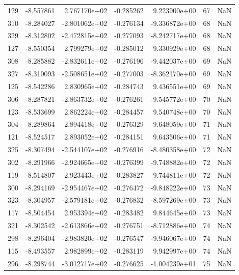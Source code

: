 \begin{tabular}{rrrrrrr}
 129 &  -8.557861 &  2.767170e+02 & -0.285262 &  9.223900e+00 &          67 & NaN \\
 310 &  -8.284027 & -2.801062e+02 & -0.276134 & -9.336872e+00 &          68 & NaN \\
 329 &  -8.312802 & -2.472815e+02 & -0.277093 & -8.242717e+00 &          68 & NaN \\
 127 &  -8.550354 &  2.799279e+02 & -0.285012 &  9.330929e+00 &          68 & NaN \\
 308 &  -8.285882 & -2.832611e+02 & -0.276196 & -9.442037e+00 &          69 & NaN \\
 327 &  -8.310093 & -2.508651e+02 & -0.277003 & -8.362170e+00 &          69 & NaN \\
 125 &  -8.542286 &  2.830965e+02 & -0.284743 &  9.436551e+00 &          69 & NaN \\
 306 &  -8.287821 & -2.863732e+02 & -0.276261 & -9.545772e+00 &          70 & NaN \\
 123 &  -8.533699 &  2.862224e+02 & -0.284457 &  9.540748e+00 &          70 & NaN \\
 304 &  -8.289864 & -2.894418e+02 & -0.276329 & -9.648059e+00 &          71 & NaN \\
 121 &  -8.524517 &  2.893052e+02 & -0.284151 &  9.643506e+00 &          71 & NaN \\
 325 &  -8.307494 & -2.544107e+02 & -0.276916 & -8.480358e+00 &          72 & NaN \\
 302 &  -8.291966 & -2.924665e+02 & -0.276399 & -9.748882e+00 &          72 & NaN \\
 119 &  -8.514807 &  2.923443e+02 & -0.283827 &  9.744811e+00 &          72 & NaN \\
 300 &  -8.294169 & -2.954467e+02 & -0.276472 & -9.848222e+00 &          73 & NaN \\
 323 &  -8.304957 & -2.579181e+02 & -0.276832 & -8.597269e+00 &          73 & NaN \\
 117 &  -8.504454 &  2.953394e+02 & -0.283482 &  9.844645e+00 &          73 & NaN \\
 321 &  -8.302542 & -2.613866e+02 & -0.276751 & -8.712886e+00 &          74 & NaN \\
 298 &  -8.296404 & -2.983820e+02 & -0.276547 & -9.946067e+00 &          74 & NaN \\
 115 &  -8.493557 &  2.982899e+02 & -0.283119 &  9.942997e+00 &          74 & NaN \\
 296 &  -8.298744 & -3.012717e+02 & -0.276625 & -1.004239e+01 &          75 & NaN \\

\end{tabular}
